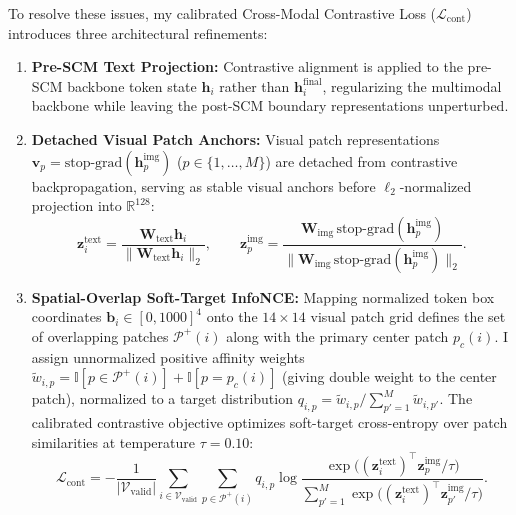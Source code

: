 To resolve these issues, my calibrated Cross-Modal Contrastive Loss ($\mathcal{L}_{\text{cont}}$) introduces three architectural refinements:
\begin{enumerate}
    \item \textbf{Pre-SCM Text Projection:} Contrastive alignment is applied to the pre-SCM backbone token state $\mathbf{h}_i$ rather than $\mathbf{h}_i^{\text{final}}$, regularizing the multimodal backbone while leaving the post-SCM boundary representations unperturbed.
    \item \textbf{Detached Visual Patch Anchors:} Visual patch representations $\mathbf{v}_p = \text{stop-grad}(\mathbf{h}_p^{\text{img}})$ ($p \in \{1, \dots, M\}$) are detached from contrastive backpropagation, serving as stable visual anchors before $\ell_2$-normalized projection into $\mathbb{R}^{128}$:
    \begin{equation}
        \mathbf{z}_i^{\text{text}} = \frac{\mathbf{W}_{\text{text}}\mathbf{h}_i}{\|\mathbf{W}_{\text{text}}\mathbf{h}_i\|_2}, \qquad
        \mathbf{z}_p^{\text{img}} = \frac{\mathbf{W}_{\text{img}}\,\text{stop-grad}(\mathbf{h}_p^{\text{img}})}{\|\mathbf{W}_{\text{img}}\,\text{stop-grad}(\mathbf{h}_p^{\text{img}})\|_2}.
    \end{equation}
    \item \textbf{Spatial-Overlap Soft-Target InfoNCE:} Mapping normalized token box coordinates $\mathbf{b}_i \in [0, 1000]^4$ onto the $14 \times 14$ visual patch grid defines the set of overlapping patches $\mathcal{P}^+(i)$ along with the primary center patch $p_c(i)$. I assign unnormalized positive affinity weights $\tilde{w}_{i,p} = \mathbb{I}[p \in \mathcal{P}^+(i)] + \mathbb{I}[p = p_c(i)]$ (giving double weight to the center patch), normalized to a target distribution $q_{i,p} = \tilde{w}_{i,p} / \sum_{p'=1}^M \tilde{w}_{i,p'}$. The calibrated contrastive objective optimizes soft-target cross-entropy over patch similarities at temperature $\tau = 0.10$:
    \begin{equation}
        \mathcal{L}_{\text{cont}} = -\frac{1}{|\mathcal{V}_{\text{valid}}|} \sum_{i \in \mathcal{V}_{\text{valid}}} \sum_{p \in \mathcal{P}^+(i)} q_{i,p} \log \frac{\exp\!\big((\mathbf{z}_i^{\text{text}})^\top \mathbf{z}_p^{\text{img}} / \tau\big)}{\sum_{p'=1}^{M} \exp\!\big((\mathbf{z}_i^{\text{text}})^\top \mathbf{z}_{p'}^{\text{img}} / \tau\big)}.
        \label{eq:contrastive_loss}
    \end{equation}
\end{enumerate}

